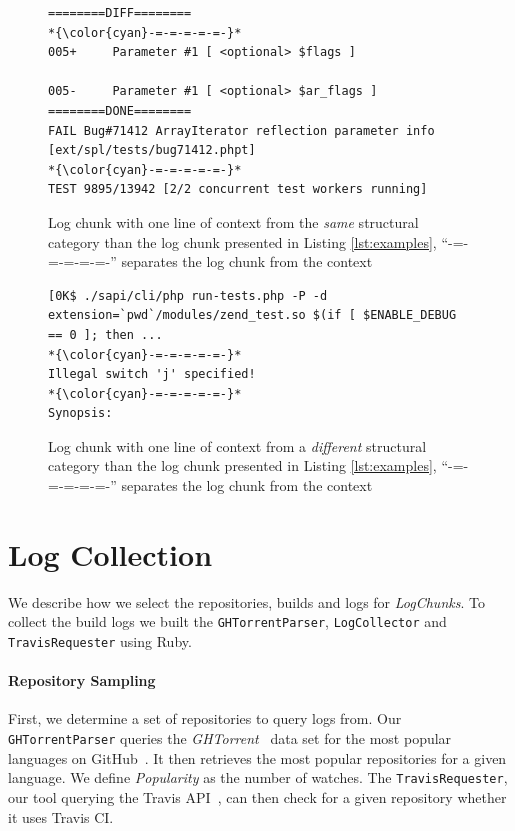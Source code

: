 \documentclass[\myrootdir/main.tex]{subfiles}
\begin{document}
\begin{figure}[]
	\centering
\begin{lstlisting}[breaklines=true]
========DIFF========
*{\color{cyan}-=-=-=-=-=-}*
005+     Parameter #1 [ <optional> $flags ]

005-     Parameter #1 [ <optional> $ar_flags ]
========DONE========
FAIL Bug#71412 ArrayIterator reflection parameter info [ext/spl/tests/bug71412.phpt] 
*{\color{cyan}-=-=-=-=-=-}*
TEST 9895/13942 [2/2 concurrent test workers running]
\end{lstlisting}
	\caption{Log chunk with one line of context from the \emph{same} structural category than the log chunk presented in Listing \ref{lst:examples}, ``{\color{cyan}-=-=-=-=-=-}'' separates the log chunk from the context}
	\label{lst:same-category}
\end{figure}

\begin{figure}[]
	\centering
\begin{lstlisting}[breaklines=true]
[0K$ ./sapi/cli/php run-tests.php -P -d extension=`pwd`/modules/zend_test.so $(if [ $ENABLE_DEBUG == 0 ]; then ...
*{\color{cyan}-=-=-=-=-=-}*
Illegal switch 'j' specified!
*{\color{cyan}-=-=-=-=-=-}*
Synopsis:
\end{lstlisting}
	\caption{Log chunk with one line of context from a \emph{different} structural category than the log chunk presented in Listing \ref{lst:examples}, ``{\color{cyan}-=-=-=-=-=-}'' separates the log chunk from the context}
	\label{lst:different-category}
\end{figure}

\section{Log Collection}
We describe how we select the repositories, builds and logs for \emph{LogChunks}.
To collect the build logs we built the  \texttt{GHTorrentParser}, \texttt{LogCollector} and \texttt{TravisRequester} using Ruby.

\paragraph{Repository Sampling}
First, we determine a set of repositories to query logs from.
Our \texttt{GHTorrentParser} queries the \emph{GHTorrent}~\cite{gousios2013ghtorrent} data set for the most popular languages on GitHub~\cite{github2019website}.
It then retrieves the most popular repositories for a given language.
We define \emph{Popularity} as the number of watches.
The \texttt{TravisRequester}, our tool querying the Travis API~\cite{travisci2019apidoc}, can then check for a given repository whether it uses Travis CI\@.
\end{document}
